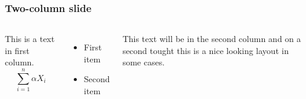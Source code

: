 \documentclass{beamer}
\begin{document}
\begin{frame}
\frametitle{Two-column slide}

\begin{columns}

This is a text in first column.
$$\sum_{i=1}^{n} \alpha X_i$$
\begin{itemize}
\item First item
\item Second item
\end{itemize}

This text will be in the second column
and on a second tought this is a nice looking
layout in some cases.
\end{columns}
\end{frame}
\end{document}
